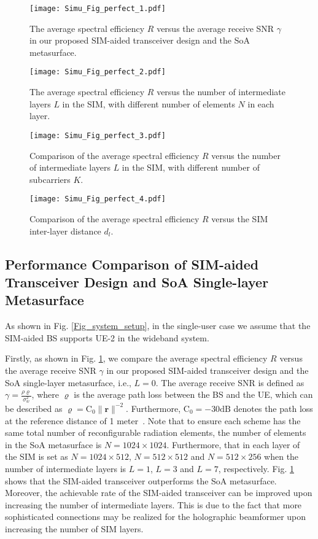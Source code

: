 \documentclass[lettersize,journal]{IEEEtran}
\theoremstyle{remark}
\begin{document}
\begin{figure}[!t]
    \centering
    \texttt{[image: Simu\_Fig\_perfect\_1.pdf]}
    \caption{The average spectral efficiency $R$ versus the average receive SNR $\gamma$ in our proposed SIM-aided transceiver design and the SoA metasurface.}\label{Simu_Fig_perfect_1}
\end{figure}

\begin{figure}[!t]
    \centering
    \texttt{[image: Simu\_Fig\_perfect\_2.pdf]}
    \caption{The average spectral efficiency $R$ versus the number of intermediate layers $L$ in the SIM, with different number of elements $N$ in each layer.}\label{Simu_Fig_perfect_2}
\end{figure}

\begin{figure}[!t]
    \centering
    \texttt{[image: Simu\_Fig\_perfect\_3.pdf]}
    \caption{Comparison of the average spectral efficiency $R$ versus the number of intermediate layers $L$ in the SIM, with different number of subcarriers $K$.}\label{Simu_Fig_perfect_3}
\end{figure}

\begin{figure}[!t]
    \centering
    \texttt{[image: Simu\_Fig\_perfect\_4.pdf]}
    \caption{Comparison of the average spectral efficiency $R$ versus the SIM inter-layer distance $d_l$.}\label{Simu_Fig_perfect_4}
\end{figure}

\subsection{Performance Comparison of SIM-aided Transceiver Design and SoA Single-layer Metasurface}
As shown in Fig. \ref{Fig_system_setup}, in the single-user case we assume that the SIM-aided BS supports UE-2 in the wideband system.

Firstly, as shown in Fig. \ref{Simu_Fig_perfect_1}, we compare the average spectral efficiency $R$ versus the average receive SNR $\gamma$ in our proposed SIM-aided transceiver design and the SoA single-layer metasurface, i.e., $L=0$. The average receive SNR is defined as $\gamma=\frac{\rho\varrho}{\sigma_w^2}$, where $\varrho$ is the average path loss between the BS and the UE, which can be described as $\varrho=\mathrm{C}_0\|\mathbf{r}\|^{-2}$. Furthermore, $\mathrm{C}_0=-30\mathrm{dB}$ denotes the path loss at the
reference distance of 1 meter~\cite{wu2021intelligent}. Note that to ensure each scheme has the same total number of reconfigurable radiation elements, the number of elements in the SoA metasurface is $N=1024\times1024$. Furthermore, that in each layer of the SIM is set as $N=1024\times512$, $N=512\times512$ and $N=512\times256$ when the number of intermediate layers is $L=1$, $L=3$ and $L=7$, respectively. Fig. \ref{Simu_Fig_perfect_1} shows that the SIM-aided transceiver outperforms the SoA metasurface. Moreover, the achievable rate of the SIM-aided transceiver can be improved upon increasing the number of intermediate layers. This is due to the fact that more sophisticated connections may be realized for the holographic beamformer upon increasing the number of SIM layers.
\end{document}
